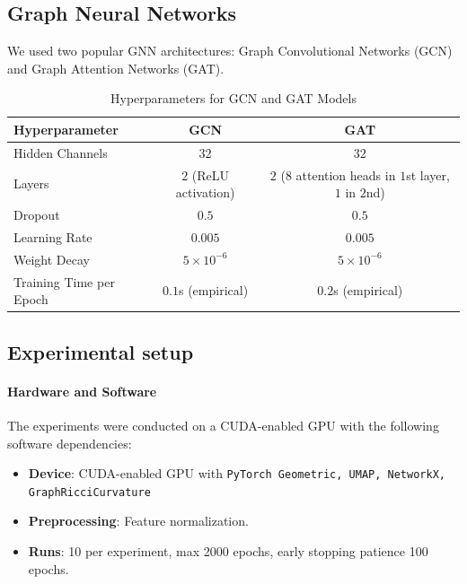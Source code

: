 \documentclass{article}
\theoremstyle{plain}
\theoremstyle{definition}
\theoremstyle{remark}
\begin{document}
\subsection{Graph Neural Networks}
We used two popular GNN architectures: Graph Convolutional Networks (GCN) and Graph Attention Networks (GAT).
\begin{table}[h!]
\caption{Hyperparameters for GCN and GAT Models}
\centering
\begin{tabular}{|l|c|c|}
\hline
\textbf{Hyperparameter}       & \textbf{GCN}                          & \textbf{GAT}                          \\ \hline
Hidden Channels               & $32$                                  & $32$                                  \\ \hline
Layers                        & $2$ (ReLU activation)                 & $2$ ($8$ attention heads in $1$st layer, $1$ in $2$nd) \\ \hline
Dropout                       & $0.5$                                 & $0.5$                                 \\ \hline
Learning Rate                 & $0.005$                               & $0.005$                               \\ \hline
Weight Decay                  & $5 \times 10^{-6}$                    & $5 \times 10^{-6}$                    \\ \hline
Training Time per Epoch       & $0.1$s (empirical)                    & $0.2$s (empirical)                    \\ \hline
\end{tabular}
\label{tab:hyperparameters}
\end{table}
\subsection{Experimental setup}
\paragraph{Hardware and Software}
The experiments were conducted on a CUDA-enabled GPU with the following software dependencies:
\begin{itemize}
    \item \textbf{Device}: CUDA-enabled GPU with \texttt{PyTorch Geometric, UMAP, NetworkX, GraphRicciCurvature}
    \item \textbf{Preprocessing}: Feature normalization.
    \item \textbf{Runs}: 10 per experiment, max 2000 epochs, early stopping patience 100 epochs.
\end{itemize}
\end{document}
